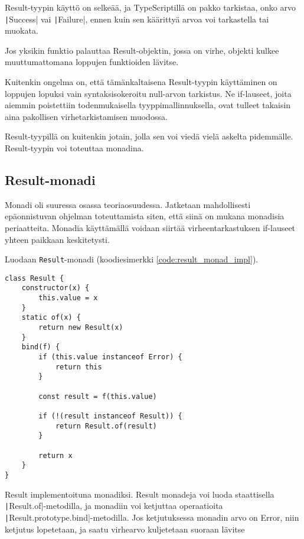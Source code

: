 Result-tyypin käyttö on selkeää, ja TypeScriptillä on pakko tarkistaa, onko arvo \texttt|Success| vai \texttt|Failure|, ennen kuin sen käärittyä arvoa voi tarkastella tai muokata.

Jos yksikin funktio palauttaa Result-objektin, jossa on virhe, objekti kulkee muuttumattomana loppujen funktioiden lävitse.

Kuitenkin ongelma on, että tämänkaltaisena Result-tyypin käyttäminen on loppujen lopuksi vain syntaksisokeroitu null-arvon tarkistus. Ne if-lauseet, joita aiemmin poistettiin todenmukaisella tyyppimallinnuksella, ovat tulleet takaisin aina pakollisen virhetarkistamisen muodossa.

Result-tyypillä on kuitenkin jotain, jolla sen voi viedä vielä askelta pidemmälle. Result-tyypin voi toteuttaa monadina.


\subsection{Result-monadi}

Monadi oli suuressa osassa teoriaosuudessa. Jatketaan mahdollisesti epäonnistuvan ohjelman toteuttamista siten, että siinä on mukana monadisia periaatteita. Monadia käyttämällä voidaan siirtää virheentarkastuksen if-lauseet yhteen paikkaan keskitetysti.

Luodaan \texttt{Result}-monadi (koodiesimerkki \ref{code:result_monad_impl}).


\begin{code}
    \begin{verbatim}
class Result {
    constructor(x) {
        this.value = x
    }
    static of(x) {
        return new Result(x)
    }
    bind(f) {
        if (this.value instanceof Error) {
            return this
        }

        const result = f(this.value)

        if (!(result instanceof Result)) {
            return Result.of(result)
        }

        return x
    }
}
\end{verbatim}
    \caption{Result implementoituna monadiksi. Result monadeja voi luoda staattisella \texttt|Result.of|-metodilla, ja monadiin voi ketjuttaa operaatioita \texttt|Result.prototype.bind|-metodilla. Jos ketjutuksessa monadin arvo on Error, niin ketjutus lopetetaan, ja saatu virhearvo kuljetetaan suoraan lävitse}
    \label{code:result_monad_impl}
\end{code}

